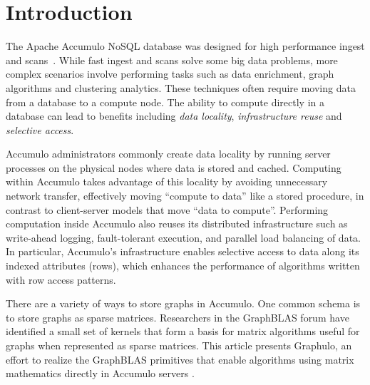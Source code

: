 
\section{Introduction}
\label{sIntro}
% 


The Apache Accumulo NoSQL database
was designed for high performance ingest and scans~\cite{sen2013benchmarking}. 
While fast ingest and scans solve some big data problems,
more complex scenarios involve performing tasks
such as data enrichment, graph algorithms and clustering analytics. These techniques
often require moving data from a database %
to a compute node. The ability to
compute directly in a database can lead to benefits including 
\emph{data locality}, \emph{infrastructure reuse} and \emph{selective access}. 

Accumulo administrators commonly create data locality 
by running server processes on the physical nodes where data is stored and cached.
Computing within Accumulo takes advantage of this locality 
by avoiding unnecessary network transfer,
effectively moving ``compute to data'' like a stored procedure,
in contrast to client-server models that move ``data to compute''.
Performing computation inside Accumulo also reuses its distributed infrastructure
such as write-ahead logging, fault-tolerant execution, and 
parallel load balancing of data.
In particular, Accumulo's infrastructure enables selective access to data along its indexed attributes (rows),
which enhances the performance of algorithms written with row access patterns.

There are a variety of ways to store graphs in Accumulo.  One common schema is
to store graphs as sparse matrices.  
Researchers in the GraphBLAS forum \cite{mattson2014standards} 
have identified a small set of kernels
that form a basis for matrix algorithms useful for graphs
when represented as sparse matrices.
This article presents Graphulo, an effort to realize the GraphBLAS primitives 
that enable algorithms using matrix mathematics directly in Accumulo servers \cite{gadepally2015gabb}.

